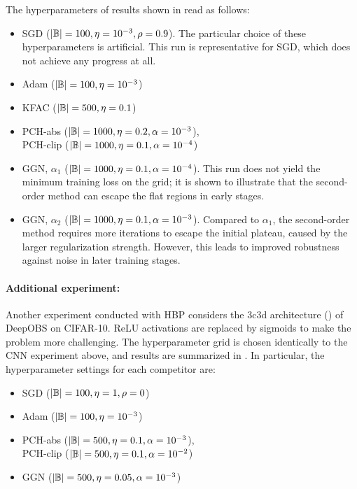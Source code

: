 The hyperparameters of results shown in  read as
follows:
\begin{itemize}
\item SGD ($|{\mathbb{B}}|= 100, \eta = 10^{-3}, \rho=0.9$). The particular choice of
  these hyperparameters is artificial. This run is representative for SGD, which
  does not achieve any progress at all.

\item Adam ($|{\mathbb{B}}|=100, \eta = 10^{-3}$)

\item KFAC ($|{\mathbb{B}}|=500, \eta = 0.1$)

\item PCH-abs ($|{\mathbb{B}}|=1000, \eta = 0.2, \alpha = 10^{-3}$),\\ PCH-clip
  ($|{\mathbb{B}}|=1000, \eta = 0.1, \alpha = 10^{-4}$)

\item GGN, $\alpha_1$ ($|{\mathbb{B}}|=1000, \eta = 0.1, \alpha = 10^{-4}$). This run
  does not yield the minimum training loss on the grid; it is shown to
  illustrate that the second-order method can escape the flat regions in early
  stages.

\item GGN, $\alpha_2$ ($|{\mathbb{B}}|=1000, \eta = 0.1, \alpha = 10^{-3}$). Compared to
  $\alpha_1$, the second-order method requires more iterations to escape the
  initial plateau, caused by the larger regularization strength. However, this
  leads to improved robustness against noise in later training stages.
\end{itemize}

\paragraph{Additional experiment:} Another experiment conducted with HBP
considers the 3c3d architecture () of
DeepOBS \citep{schneider2019deepobs} on CIFAR-10. ReLU activations are replaced
by sigmoids to make the problem more challenging. The hyperparameter grid is
chosen identically to the CNN experiment above, and results are summarized in
. In particular, the hyperparameter settings for
each competitor are:
\begin{itemize}
\item SGD ($|{\mathbb{B}}|= 100, \eta = 1, \rho =0$)
\item Adam ($|{\mathbb{B}}|=100, \eta = 10^{-3}$)
\item PCH-abs ($|{\mathbb{B}}|=500, \eta = 0.1, \alpha = 10^{-3}$),\\ PCH-clip ($|{\mathbb{B}}|=500, \eta = 0.1, \alpha = 10^{-2}$)
\item GGN ($|{\mathbb{B}}|=500, \eta = 0.05, \alpha = 10^{-3}$)
\end{itemize}


